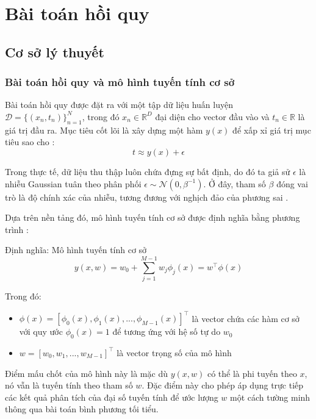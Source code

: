\section{Bài toán hồi quy}

\subsection{Cơ sở lý thuyết}

\subsubsection{Bài toán hồi quy và mô hình tuyến tính cơ sở}

Bài toán hồi quy được đặt ra với một tập dữ liệu huấn luyện $\mathcal{D}=\{(x_{n},t_{n})\}_{n=1}^{N}$, trong đó $x_{n}\in\mathbb{R}^{D}$ đại diện cho vector đầu vào và $t_{n}\in\mathbb{R}$ là giá trị đầu ra. Mục tiêu cốt lõi là xây dựng một hàm $y(x)$ để xấp xỉ giá trị mục tiêu sao cho \cite{bishop2006pattern}:
$$t\approx y(x)+\epsilon$$

Trong thực tế, dữ liệu thu thập luôn chứa đựng sự bất định, do đó ta giả sử $\epsilon$ là nhiễu Gaussian tuân theo phân phối $\epsilon\sim\mathcal{N}(0,\beta^{-1})$. Ở đây, tham số $\beta$ đóng vai trò là độ chính xác của nhiễu, tương đương với nghịch đảo của phương sai \cite{bishop2006pattern}.

Dựa trên nền tảng đó, mô hình tuyến tính cơ sở được định nghĩa bằng phương trình \cite{bishop2006pattern}:

\begin{infobox}{Định nghĩa: Mô hình tuyến tính cơ sở}
$$y(x,w)=w_{0}+\sum_{j=1}^{M-1}w_{j}\phi_{j}(x)=w^{\top}\phi(x)$$

Trong đó:
\begin{itemize}
    \item $\phi(x)=[\phi_{0}(x),\phi_{1}(x),...,\phi_{M-1}(x)]^{\top}$ là vector chứa các hàm cơ sở với quy ước $\phi_{0}(x)=1$ để tương ứng với hệ số tự do $w_0$
    \item $w=[w_{0},w_{1},...,w_{M-1}]^{\top}$ là vector trọng số của mô hình
\end{itemize}
\end{infobox}

Điểm mấu chốt của mô hình này là mặc dù $y(x,w)$ có thể là phi tuyến theo $x$, nó vẫn là tuyến tính theo tham số $w$. Đặc điểm này cho phép áp dụng trực tiếp các kết quả phân tích của đại số tuyến tính để ước lượng $w$ một cách tường minh thông qua bài toán bình phương tối tiểu.

